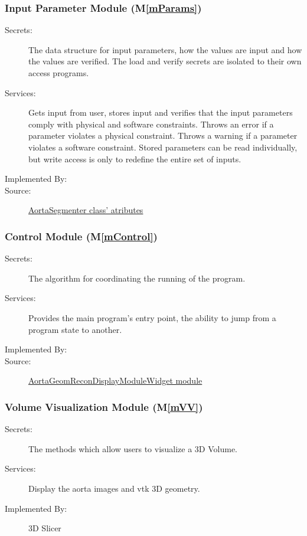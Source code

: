 \documentclass[12pt, titlepage]{article}
\newcommand{\mref}[1]{M\ref{#1}}
\begin{document}
\subsubsection{Input Parameter Module (\mref{mParams})}

\begin{description}
\item[Secrets:] The data structure for input parameters, how the
values are input and how the values are verified.  The load and verify secrets
are isolated to their own access programs.
\item[Services:] Gets input from user, stores input and verifies that the
  input parameters comply with physical and software constraints. Throws an
  error if a parameter violates a physical constraint. Throws a warning if a
  parameter violates a software constraint.  Stored parameters can be read
  individually, but write access is only to redefine the entire set of inputs.
\item[Implemented By:] \progname{}
\item[Source:] \href{https://joviel25.github.io/AortaGR-design-document/AortaGeomReconDisplayModuleLib.html#AortaSegmenter.AortaSegmenter}{AortaSegmenter class' atributes}
\end{description}

\subsubsection{Control Module (\mref{mControl})}

\begin{description}
\item[Secrets:]The algorithm for coordinating the running of the program.
\item[Services:]Provides the main program's entry point, the ability to jump from a program state to another.
\item[Implemented By:] \progname
\item[Source:] \href{https://joviel25.github.io/AortaGR-design-document/AortaGeomReconDisplayModule.html#AortaGeomReconDisplayModule.AortaGeomReconDisplayModuleWidget.onApplyButton}{AortaGeomReconDisplayModuleWidget module}
\end{description}

\subsubsection{Volume Visualization Module (\mref{mVV})}
\begin{description}
\item[Secrets:]The methods which allow users to visualize a 3D Volume.
\item[Services:]Display the aorta images and vtk 3D geometry.
\item[Implemented By:] 3D Slicer
\end{description}
\end{document}
